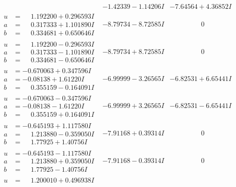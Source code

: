 \documentclass[1p]{elsarticle_modified}
\theoremstyle{definition}
\begin{document}
$$\begin{array}{c|c|c}
 & -1.42339 - 1.14206 I & -7.64564 + 4.36852 I \\ \hline\begin{aligned}
u &= \phantom{-}1.192200 + 0.296593 I \\
a &= \phantom{-}0.317333 + 1.101890 I \\
b &= \phantom{-}0.334681 + 0.650646 I\end{aligned}
 & -8.79734 - 8.72585 I & \phantom{-0.000000 } 0 \\ \hline\begin{aligned}
u &= \phantom{-}1.192200 - 0.296593 I \\
a &= \phantom{-}0.317333 - 1.101890 I \\
b &= \phantom{-}0.334681 - 0.650646 I\end{aligned}
 & -8.79734 + 8.72585 I & \phantom{-0.000000 } 0 \\ \hline\begin{aligned}
u &= -0.670063 + 0.347596 I \\
a &= -0.08138 + 1.61220 I \\
b &= \phantom{-}0.355159 - 0.164091 I\end{aligned}
 & -6.99999 - 3.26565 I & -6.82531 + 6.65441 I \\ \hline\begin{aligned}
u &= -0.670063 - 0.347596 I \\
a &= -0.08138 - 1.61220 I \\
b &= \phantom{-}0.355159 + 0.164091 I\end{aligned}
 & -6.99999 + 3.26565 I & -6.82531 - 6.65441 I \\ \hline\begin{aligned}
u &= -0.645193 + 1.117580 I \\
a &= \phantom{-}1.213880 - 0.359050 I \\
b &= \phantom{-}1.77925 + 1.40756 I\end{aligned}
 & -7.91168 + 0.39314 I & \phantom{-0.000000 } 0 \\ \hline\begin{aligned}
u &= -0.645193 - 1.117580 I \\
a &= \phantom{-}1.213880 + 0.359050 I \\
b &= \phantom{-}1.77925 - 1.40756 I\end{aligned}
 & -7.91168 - 0.39314 I & \phantom{-0.000000 } 0 \\ \hline\begin{aligned}
u &= \phantom{-}1.200010 + 0.496938 I \\

\end{aligned}
\end{array}$$
\end{document}
